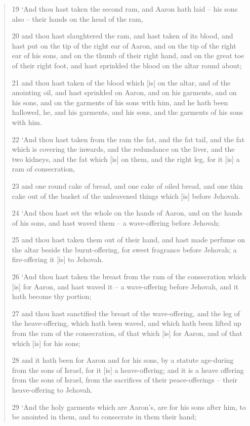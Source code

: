 \documentclass[11pt]{article}
\begin{document}
\begin{quote}
19 `And thou hast taken the second ram, and Aaron hath laid -- his sons also -- their hands on the head of the ram,

20 and thou hast slaughtered the ram, and hast taken of its blood, and hast put on the tip of the right ear of Aaron, and on the tip of the right ear of his sons, and on the thumb of their right hand, and on the great toe of their right foot, and hast sprinkled the blood on the altar round about;

21 and thou hast taken of the blood which [is] on the altar, and of the anointing oil, and hast sprinkled on Aaron, and on his garments, and on his sons, and on the garments of his sons with him, and he hath been hallowed, he, and his garments, and his sons, and the garments of his sons with him.

22 `And thou hast taken from the ram the fat, and the fat tail, and the fat which is covering the inwards, and the redundance on the liver, and the two kidneys, and the fat which [is] on them, and the right leg, for it [is] a ram of consecration,

23 and one round cake of bread, and one cake of oiled bread, and one thin cake out of the basket of the unleavened things which [is] before Jehovah.

24 `And thou hast set the whole on the hands of Aaron, and on the hands of his sons, and hast waved them -- a wave-offering before Jehovah;

25 and thou hast taken them out of their hand, and hast made perfume on the altar beside the burnt-offering, for sweet fragrance before Jehovah; a fire-offering it [is] to Jehovah.

26 `And thou hast taken the breast from the ram of the consecration which [is] for Aaron, and hast waved it -- a wave-offering before Jehovah, and it hath become thy portion;

27 and thou hast sanctified the breast of the wave-offering, and the leg of the heave-offering, which hath been waved, and which hath been lifted up from the ram of the consecration, of that which [is] for Aaron, and of that which [is] for his sons;

28 and it hath been for Aaron and for his sons, by a statute age-during from the sons of Israel, for it [is] a heave-offering; and it is a heave offering from the sons of Israel, from the sacrifices of their peace-offerings -- their heave-offering to Jehovah.

29 `And the holy garments which are Aaron's, are for his sons after him, to be anointed in them, and to consecrate in them their hand;


\end{quote}
\end{document}
